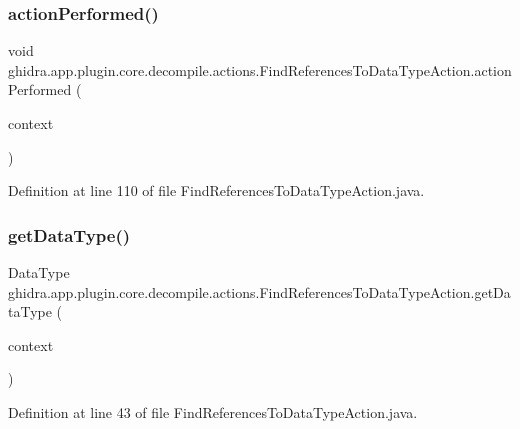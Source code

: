 \subsubsection{\texorpdfstring{actionPerformed()}{actionPerformed()}}
{\footnotesize\ttfamily void ghidra.\+app.\+plugin.\+core.\+decompile.\+actions.\+Find\+References\+To\+Data\+Type\+Action.\+action\+Performed (\begin{DoxyParamCaption}\item[{Action\+Context}]{context }\end{DoxyParamCaption})\hspace{0.3cm}{\ttfamily [inline]}}



Definition at line 110 of file Find\+References\+To\+Data\+Type\+Action.\+java.

\mbox{\label{classghidra_1_1app_1_1plugin_1_1core_1_1decompile_1_1actions_1_1_find_references_to_data_type_action_a7a6072e0b054bef56b8a5dbcef1e6f4d}} 
\subsubsection{\texorpdfstring{getDataType()}{getDataType()}}
{\footnotesize\ttfamily Data\+Type ghidra.\+app.\+plugin.\+core.\+decompile.\+actions.\+Find\+References\+To\+Data\+Type\+Action.\+get\+Data\+Type (\begin{DoxyParamCaption}\item[{Action\+Context}]{context }\end{DoxyParamCaption})\hspace{0.3cm}{\ttfamily [inline]}}



Definition at line 43 of file Find\+References\+To\+Data\+Type\+Action.\+java.


